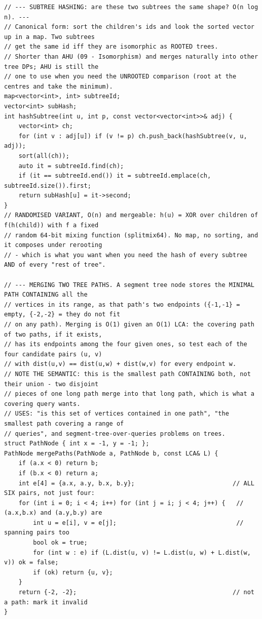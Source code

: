 \documentclass[9pt,a4paper,twocolumn]{extarticle}
\begin{document}
\begin{lstlisting}
// --- SUBTREE HASHING: are these two subtrees the same shape? O(n log n). ---
// Canonical form: sort the children's ids and look the sorted vector up in a map. Two subtrees
// get the same id iff they are isomorphic as ROOTED trees.
// Shorter than AHU (09 - Isomorphism) and merges naturally into other tree DPs; AHU is still the
// one to use when you need the UNROOTED comparison (root at the centres and take the minimum).
map<vector<int>, int> subtreeId;
vector<int> subHash;
int hashSubtree(int u, int p, const vector<vector<int>>& adj) {
    vector<int> ch;
    for (int v : adj[u]) if (v != p) ch.push_back(hashSubtree(v, u, adj));
    sort(all(ch));
    auto it = subtreeId.find(ch);
    if (it == subtreeId.end()) it = subtreeId.emplace(ch, subtreeId.size()).first;
    return subHash[u] = it->second;
}
// RANDOMISED VARIANT, O(n) and mergeable: h(u) = XOR over children of f(h(child)) with f a fixed
// random 64-bit mixing function (splitmix64). No map, no sorting, and it composes under rerooting
// - which is what you want when you need the hash of every subtree AND of every "rest of tree".

// --- MERGING TWO TREE PATHS. A segment tree node stores the MINIMAL PATH CONTAINING all the
// vertices in its range, as that path's two endpoints ({-1,-1} = empty, {-2,-2} = they do not fit
// on any path). Merging is O(1) given an O(1) LCA: the covering path of two paths, if it exists,
// has its endpoints among the four given ones, so test each of the four candidate pairs (u, v)
// with dist(u,v) == dist(u,w) + dist(w,v) for every endpoint w.
// NOTE THE SEMANTIC: this is the smallest path CONTAINING both, not their union - two disjoint
// pieces of one long path merge into that long path, which is what a covering query wants.
// USES: "is this set of vertices contained in one path", "the smallest path covering a range of
// queries", and segment-tree-over-queries problems on trees.
struct PathNode { int x = -1, y = -1; };
PathNode mergePaths(PathNode a, PathNode b, const LCA& L) {
    if (a.x < 0) return b;
    if (b.x < 0) return a;
    int e[4] = {a.x, a.y, b.x, b.y};                           // ALL SIX pairs, not just four:
    for (int i = 0; i < 4; i++) for (int j = i; j < 4; j++) {   // (a.x,b.x) and (a.y,b.y) are
        int u = e[i], v = e[j];                                 // spanning pairs too
        bool ok = true;
        for (int w : e) if (L.dist(u, v) != L.dist(u, w) + L.dist(w, v)) ok = false;
        if (ok) return {u, v};
    }
    return {-2, -2};                                           // not a path: mark it invalid
}
\end{lstlisting}
\end{document}

